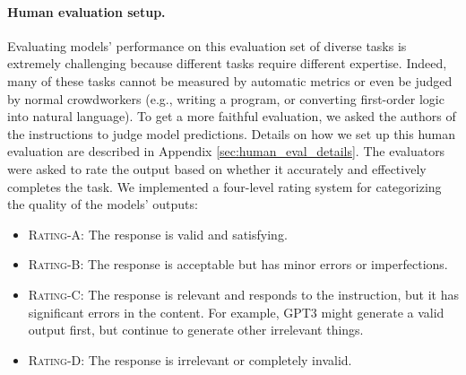 \documentclass[11pt]{article}
\begin{document}
\paragraph{Human evaluation setup.}
Evaluating models' performance on this evaluation set of diverse tasks is extremely challenging because different tasks require different expertise. Indeed, many of these tasks cannot be measured by automatic metrics or even be judged by normal crowdworkers (e.g., writing a program, or converting first-order logic into natural language). To get a more faithful evaluation, we asked the authors of the instructions to judge model predictions. Details on how we set up this human evaluation are described in Appendix \ref{sec:human_eval_details}. The evaluators were asked to rate the output based on whether it accurately and effectively completes the task. We implemented a four-level rating system for categorizing the quality of the models' outputs: 
\vspace{-0.3cm}
\begin{itemize}[noitemsep, leftmargin=*]
    \item \textsc{Rating-A:} The response is valid and satisfying.
    \item \textsc{Rating-B:} The response is acceptable but has minor errors or imperfections.
    \item \textsc{Rating-C:} The response is relevant and responds to the instruction, but it has significant errors in the content. For example, GPT3 might generate a valid output first, but continue to generate other irrelevant things.
    \item \textsc{Rating-D:} The response is irrelevant or completely invalid.
\end{itemize}
\vspace{-0.3cm}
\end{document}
